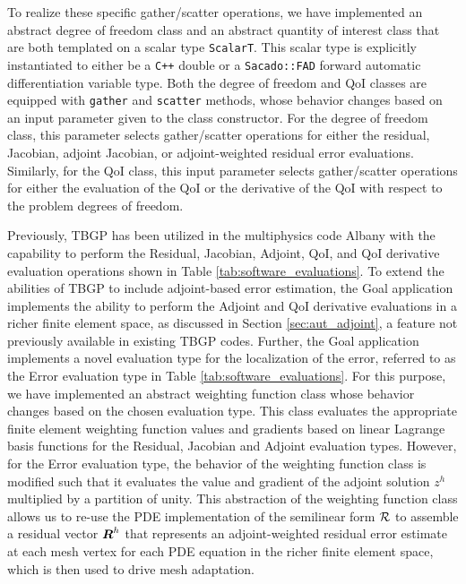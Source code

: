 To realize these specific gather/scatter operations, we have implemented
an abstract degree of freedom class and an abstract quantity of interest
class that are both templated on a scalar type \texttt{ScalarT}. This
scalar type is explicitly instantiated to either be a \texttt{C++} double
or a \texttt{Sacado::FAD} forward automatic differentiation variable type.
Both the degree of freedom and QoI classes are equipped with \texttt{gather}
and \texttt{scatter} methods, whose behavior changes based on an input
parameter given to the class constructor. For the degree of freedom
class, this parameter selects gather/scatter operations for either the
residual, Jacobian, adjoint Jacobian, or adjoint-weighted residual error
evaluations. Similarly, for the QoI class, this input parameter selects
gather/scatter operations for either the evaluation of the QoI
or the derivative of the QoI with respect to the problem degrees of freedom.

Previously, TBGP has been utilized in the multiphysics code
Albany \cite{salinger2013albany, tezaur2015albany} with the capability
to perform the Residual, Jacobian, Adjoint, QoI, and QoI derivative
evaluation operations shown in Table \ref{tab:software_evaluations}.
To extend the abilities of TBGP to include adjoint-based error estimation,
the Goal application implements the ability to perform the Adjoint and
QoI derivative evaluations in a richer finite element space, as
discussed in Section \ref{sec:aut_adjoint}, a feature not previously
available in existing TBGP codes. Further, the Goal application implements a
novel evaluation type for the localization of the error, referred to as the
Error evaluation type in Table \ref{tab:software_evaluations}. For this purpose,
we have implemented an abstract weighting function class whose
behavior changes based on the chosen evaluation type. This class
evaluates the appropriate finite element weighting function values
and gradients based on linear Lagrange basis functions for the
Residual, Jacobian and Adjoint evaluation types. However, for the
Error evaluation type, the behavior of the weighting function
class is modified such that it evaluates the value and gradient
of the adjoint solution $z^h$ multiplied by a partition of unity. This abstraction of the
weighting function class
allows us to re-use the PDE implementation of the semilinear form
$\mathcal{R}$ to assemble a residual vector $\boldsymbol{R}^h$ that represents an
adjoint-weighted residual error estimate at each mesh vertex for each PDE
equation in the richer finite element space, which is then used
to drive mesh adaptation.

